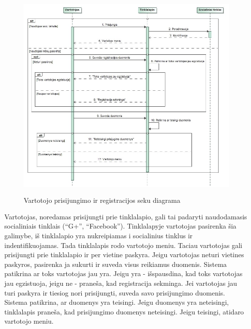 ﻿\documentclass{VUMIFPSkursinis}
\begin{document}
\begin{figure}[H]
    \centering
    \includegraphics[scale=0.5]{img/geri/KlientPrisijungimas}
    \label{img:uml24}
	\caption{Vartotojo prisijungimo ir registracijos seku diagrama}
\end{figure}

Vartotojas, noredamas prisijungti prie tinklalapio, gali tai padaryti naudodamasis socialiniais tinklais (“G+”, “Facebook”). Tinklalapyje vartotojas pasirenka šia galimybe, iš tinklalapio yra nukreipiamas i socialinius tinklus ir indentifikuojamas. Tada tinklalapis rodo vartotojo meniu. Taciau vartotojas gali prisijungti prie tinklalapio ir per vietine paskyra. Jeigu vartotojas neturi vietines paskyros, pasirenka ja sukurti ir suveda visus reikiamus duomenis. Sistema patikrina ar toks vartotojas jau yra. Jeigu yra - išspausdina, kad toks vartotojas jau egzistuoja, jeigu ne - praneša, kad registracija sekminga. Jei vartotojas jau turi paskyra ir tiesiog nori prisijungti, suveda savo prisijungimo duomenis. Sistema patikrina, ar duomenys yra teisingi. Jeigu duomenys yra neteisingi, tinklalapis praneša, kad prisijungimo duomenys neteisingi. Jeigu teisingi, atidaro vartotojo meniu.
\end{document}
